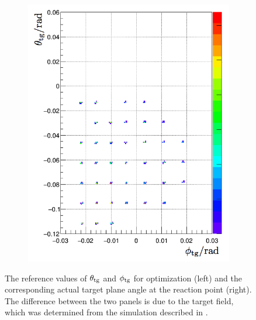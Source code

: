 \begin{figure}[tb!]
\begin{subfigure}[t]{0.45\textwidth}
    \includegraphics[width=\textwidth]{figs/initial-angle-simulation.png}
  \end{subfigure}
  \caption[Reference values for angular optimization.]{The reference values of $\theta_{\mathrm{tg}}$ and $\phi_{\mathrm{tg}}$ for optimization (left) and the corresponding actual target plane angle at the reaction point (right). The difference between the two panels is due to the target field, which was determined from the simulation described in . \label{C6S3SS2F2}}
\end{figure}

